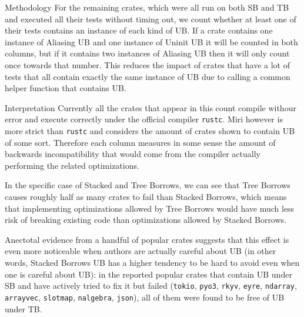 \documentclass[a4paper,11pt]{article}
\theoremstyle{plain}
\theoremstyle{definition}
\theoremstyle{remark}
\begin{document}
\begin{paragraph}{Methodology}
    For the remaining crates, which were all run on both SB and TB and executed all their tests without timing out,
    we count whether at least one of their tests contains an instance of each kind of UB.
    If a crate contains one instance of Aliasing UB and one instance of Uninit UB it will be counted in both columns,
    but if it contains two instances of Aliasing UB then it will only count once towards that number.
    This reduces the impact of crates that have a lot of tests that all contain exactly the same instance of UB
    due to calling a common helper function that contains UB.
\end{paragraph}

\begin{paragraph}{Interpretation}
    Currently all the crates that appear in this count compile withour error and execute correctly
    under the official compiler \texttt{rustc}.
    Miri however is more strict than \texttt{rustc} and considers the amount of crates shown to contain UB of some sort.
    Therefore each column measures in some sense the amount of backwards incompatibility that would come
    from the compiler actually performing the related optimizations.

    In the specific case of Stacked and Tree Borrows, we can see that Tree Borrows causes roughly
    half as many crates to fail than Stacked Borrows, which means that implementing optimizations
    allowed by Tree Borrows would have much less risk of breaking existing code than optimizations
    allowed by Stacked Borrows.

    Anectotal evidence from a handful of popular crates suggests that this effect is even more
    noticeable when authors are actually careful about UB (in other words, Stacked Borrows UB
    has a higher tendency to be hard to avoid even when one is careful about UB):
    in the reported popular crates that contain UB under SB and have actively tried to fix it but failed
    (\texttt{tokio}, \texttt{pyo3}, \texttt{rkyv}, \texttt{eyre}, \texttt{ndarray}, \texttt{arrayvec},
    \texttt{slotmap}, \texttt{nalgebra}, \texttt{json}), all of them were found to be free of UB under TB.
\end{paragraph}
\end{document}
